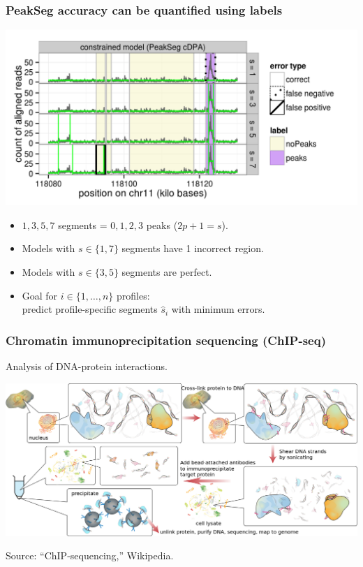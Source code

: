 \documentclass{beamer}
\begin{document}
\begin{frame}
  \frametitle{PeakSeg accuracy can be quantified using labels}
  \includegraphics[width=\textwidth]{figure-Segmentor-PeakSeg-constrained-regions}

  \begin{itemize}
  \item $1, 3, 5, 7$ segments = $0, 1, 2, 3$ peaks ($2p + 1 = s$).
  \item Models with $s\in\{1, 7\}$ segments have 1 incorrect region.
  \item Models with $s\in\{3, 5\}$ segments are perfect.
  \item Goal for $i\in\{1, \dots, n\}$ profiles:\\
    predict profile-specific segments $\hat s_i$ with minimum errors.
  \end{itemize}
\end{frame}

\begin{frame}
  \frametitle{Chromatin immunoprecipitation sequencing (ChIP-seq)}
  Analysis of DNA-protein interactions.

  \includegraphics[width=\textwidth]{Chromatin_immunoprecipitation_sequencing_wide.png}

  Source: ``ChIP-sequencing,'' Wikipedia.
\end{frame}
\end{document}
